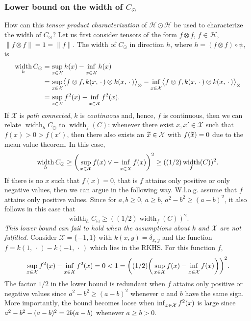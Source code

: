 \documentclass[10pt]{amsart}
\theoremstyle{definition}\newtheorem{defi}[theo]{Definition}\newtheorem{rema}[theo]{Remark}\newtheorem{exam}[theo]{Example}\newtheorem{exem}[theo]{Example}\newtheorem{nota}[theo]{Notation}
\theoremstyle{remark}
\DeclareMathOperator*{\infd}{inf\vphantom{p}}
\DeclareMathOperator{\diam}{width}
\newcommand{\X}{\mathcal{X}}
\newcommand{\cH}{\mathcal{H}}
\let\oldtilde\tilde
\renewcommand*{\tilde}[1]{\mathchoice{\widetilde{#1}}{\widetilde{#1}}{\oldtilde{#1}}{\oldtilde{#1}}}
\let\originalleft\left
\let\originalright\right
\renewcommand{\left}{\mathopen{}\mathclose\bgroup\originalleft}
\renewcommand{\right}{\aftergroup\egroup\originalright}
\begin{document}
\subsubsection{Lower bound on the width of \texorpdfstring{$C_\odot$}{C\_ odot}} How can this \emph{tensor product characterization} of $\cH \odot \cH$ be used to characterize the width of $C_\odot$? Let us first consider tensors of the form $f\otimes f$, $f\in \cH$, $\|f \otimes f\| = 1 = \|f\|$. The width of $C_\odot$ in direction $h$, where $h = (f \otimes f) \circ \psi$, is
\begin{align*}
\diam_{h} C_\odot &= \sup_{x\in \X} h(x) - \infd_{x\in \X} h(x) \\
&= \sup_{x\in \X} \bigl\langle f \otimes f, k(x,\,\cdot\,) \otimes k(x,\,\cdot\,) \bigr\rangle_\otimes - \infd_{x\in \X} \bigl\langle f\otimes f, k(x,\,\cdot\,) \otimes k(x,\,\cdot\,) \bigr\rangle_\otimes \\
&= \sup_{x\in \X} f^2(x) - \infd_{x\in \X} f^2(x).
\end{align*}
If $\X$ is \emph{path connected}, $k$ is \emph{continuous} and, hence, $f$ is continuous, then we can relate $\diam_h C_\odot$ to $\diam_f(C)$: whenever there exist $x,x' \in \X$ such that $f(x) > 0 > f(x')$, then there also exists an $\tilde x \in \X$ with $f(\tilde x) = 0$ due to the mean value theorem. In this case,
\[
\diam_{h} C_\odot \geq \left(\,\sup_{x \in \X} f(x) \vee - \infd_{x\in X} f(x)\right)^2 \geq ((1/2) \diam_f(C))^2.
\]
If there is no $x$ such that $f(x) =0$, that is $f$ attains only positive or only negative values, then we can argue in the following way. W.l.o.g. assume that $f$ attains only positive values. Since for $a,b \geq 0$, $a \geq b$, $a^2 - b^2 \geq (a-b)^2$, it also follows in this case that
\begin{equation*}
\diam_{h} C_\odot \geq ((1/2) \diam_f(C))^2.
\end{equation*}
\emph{This lower bound can fail to hold when the assumptions about $k$ and $\X$ are not fulfilled}. Consider $\X = \{-1,1\}$ with $k(x,y) = \delta_{x,y}$ and the function $f = k(1,\,\cdot\,) - k(-1,\,\cdot\,)$ which lies in the RKHS. For this function $f$,
\[
\sup_{x\in \X} f^2(x) - \infd_{x \in \X} f^2(x) = 0 < 1 = \left((1/2) \left(\,\sup_{x\in \X} f(x) - \infd_{x\in \X} f(x)\right)\right)^2.
\]
The factor $1/2$ in the lower bound is redundant when $f$ attains only positive or negative values since $a^2 - b^2 \geq (a-b)^2$ whenever $a$ and $b$ have the same sign. More importantly, the bound becomes loose when $\infd_{x\in \X} f^2(x)$ is large since $a^2 - b^2 -\linebreak (a-b)^2 = 2b (a-b)$ whenever $a \geq b > 0$.
\end{document}
